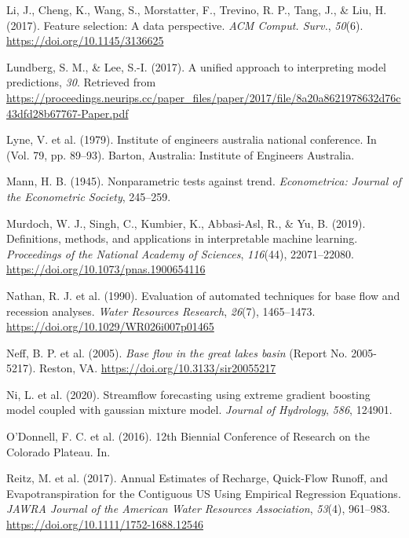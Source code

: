 \documentclass[
]{agujournal2019}
\newlength{\cslhangindent}
\newenvironment{CSLReferences}[2] %
 {\begin{list}{}{%
  \setlength{\itemindent}{0pt}
  \setlength{\leftmargin}{0pt}
  \setlength{\parsep}{0pt}
  \ifodd #1
   \setlength{\leftmargin}{\cslhangindent}
   \setlength{\itemindent}{-1\cslhangindent}
  \fi
  \setlength{\itemsep}{#2\baselineskip}}}
 {\end{list}}
\begin{document}
\begin{CSLReferences}{1}{0}
Li, J., Cheng, K., Wang, S., Morstatter, F., Trevino, R. P., Tang, J.,
\& Liu, H. (2017). Feature selection: A data perspective. \emph{ACM
Comput. Surv.}, \emph{50}(6). \url{https://doi.org/10.1145/3136625}

Lundberg, S. M., \& Lee, S.-I. (2017). A unified approach to
interpreting model predictions, \emph{30}. Retrieved from
\url{https://proceedings.neurips.cc/paper_files/paper/2017/file/8a20a8621978632d76c43dfd28b67767-Paper.pdf}

Lyne, V. et al. (1979). Institute of engineers australia national
conference. In (Vol. 79, pp. 89--93). Barton, Australia: Institute of
Engineers Australia.

Mann, H. B. (1945). Nonparametric tests against trend.
\emph{Econometrica: Journal of the Econometric Society}, 245--259.

Murdoch, W. J., Singh, C., Kumbier, K., Abbasi-Asl, R., \& Yu, B.
(2019). Definitions, methods, and applications in interpretable machine
learning. \emph{Proceedings of the National Academy of Sciences},
\emph{116}(44), 22071--22080.
\url{https://doi.org/10.1073/pnas.1900654116}

Nathan, R. J. et al. (1990). Evaluation of automated techniques for base
flow and recession analyses. \emph{Water Resources Research},
\emph{26}(7), 1465--1473. \url{https://doi.org/10.1029/WR026i007p01465}

Neff, B. P. et al. (2005). \emph{Base flow in the great lakes basin}
(Report No. 2005-5217). Reston, VA.
\url{https://doi.org/10.3133/sir20055217}

Ni, L. et al. (2020). Streamflow forecasting using extreme gradient
boosting model coupled with gaussian mixture model. \emph{Journal of
Hydrology}, \emph{586}, 124901.

O'Donnell, F. C. et al. (2016). 12th Biennial Conference of Research on
the Colorado Plateau. In.

Reitz, M. et al. (2017). Annual Estimates of Recharge, Quick{-}Flow
Runoff, and Evapotranspiration for the Contiguous US Using Empirical
Regression Equations. \emph{JAWRA Journal of the American Water
Resources Association}, \emph{53}(4), 961--983.
\url{https://doi.org/10.1111/1752-1688.12546}


\end{CSLReferences}
\end{document}
